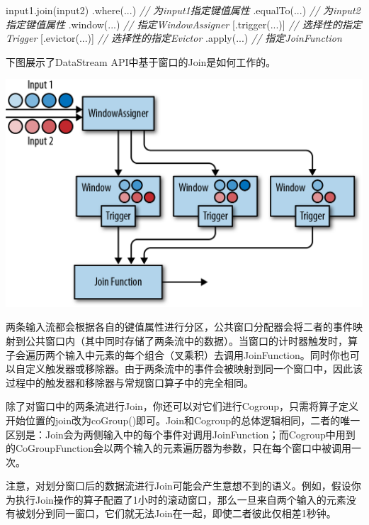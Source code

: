 \documentclass[cn,11pt,chinese]{elegantbook}
\newenvironment{Shaded}{}{}
\newcommand{\CommentTok}[1]{\textcolor[rgb]{0.38,0.63,0.69}{\textit{#1}}}
\newcommand{\FunctionTok}[1]{\textcolor[rgb]{0.02,0.16,0.49}{#1}}
\newcommand{\NormalTok}[1]{#1}
\renewenvironment{quote}{\begin{customblockquote}\list{}{\rightmargin=0em\leftmargin=0em}%
\item\relax\color{blockquote-text}\ignorespaces}{\unskip\unskip\endlist\end{customblockquote}}
\begin{document}
\begin{Shaded}
\begin{Highlighting}[]
\NormalTok{input1.}\FunctionTok{join}\NormalTok{(input2)}
\NormalTok{  .}\FunctionTok{where}\NormalTok{(...)       }\CommentTok{// 为input1指定键值属性}
\NormalTok{  .}\FunctionTok{equalTo}\NormalTok{(...)     }\CommentTok{// 为input2指定键值属性}
\NormalTok{  .}\FunctionTok{window}\NormalTok{(...)      }\CommentTok{// 指定WindowAssigner}
\NormalTok{  [.}\FunctionTok{trigger}\NormalTok{(...)]   }\CommentTok{// 选择性的指定Trigger}
\NormalTok{  [.}\FunctionTok{evictor}\NormalTok{(...)]   }\CommentTok{// 选择性的指定Evictor}
\NormalTok{  .}\FunctionTok{apply}\NormalTok{(...)       }\CommentTok{// 指定JoinFunction}
\end{Highlighting}
\end{Shaded}

下图展示了DataStream API中基于窗口的Join是如何工作的。

\includegraphics{images/spaf_0608.png}

两条输入流都会根据各自的键值属性进行分区，公共窗口分配器会将二者的事件映射到公共窗口内（其中同时存储了两条流中的数据）。当窗口的计时器触发时，算子会遍历两个输入中元素的每个组合（叉乘积）去调用JoinFunction。同时你也可以自定义触发器或移除器。由于两条流中的事件会被映射到同一个窗口中，因此该过程中的触发器和移除器与常规窗口算子中的完全相同。

除了对窗口中的两条流进行Join，你还可以对它们进行Cogroup，只需将算子定义开始位置的join改为coGroup()即可。Join和Cogroup的总体逻辑相同，二者的唯一区别是：Join会为两侧输入中的每个事件对调用JoinFunction；而Cogroup中用到的CoGroupFunction会以两个输入的元素遍历器为参数，只在每个窗口中被调用一次。

\begin{quote}
注意，对划分窗口后的数据流进行Join可能会产生意想不到的语义。例如，假设你为执行Join操作的算子配置了1小时的滚动窗口，那么一旦来自两个输入的元素没有被划分到同一窗口，它们就无法Join在一起，即使二者彼此仅相差1秒钟。
\end{quote}
\end{document}
